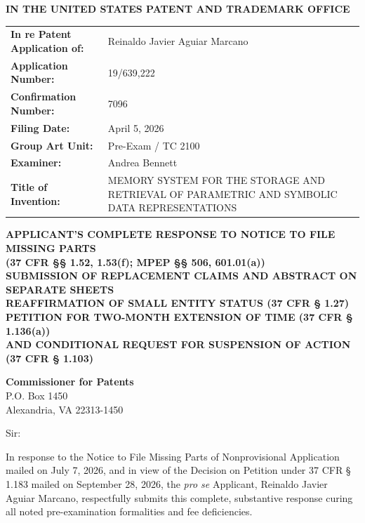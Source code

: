 \documentclass[11pt,letterpaper]{article}
\begin{document}
\thispagestyle{empty}

\begin{center}
    \large\textbf{IN THE UNITED STATES PATENT AND TRADEMARK OFFICE} \\
\end{center}

\vspace{0.3cm}
\noindent\begin{tabular}{p{2.3in}p{4.0in}}
\textbf{In re Patent Application of:} & Reinaldo Javier Aguiar Marcano \\
\textbf{Application Number:} & 19/639,222 \\
\textbf{Confirmation Number:} & 7096 \\
\textbf{Filing Date:} & April 5, 2026 \\
\textbf{Group Art Unit:} & Pre-Exam / TC 2100 \\
\textbf{Examiner:} & Andrea Bennett \\
\textbf{Title of Invention:} & MEMORY SYSTEM FOR THE STORAGE AND RETRIEVAL OF PARAMETRIC AND SYMBOLIC DATA REPRESENTATIONS \\
\end{tabular}

\vspace{0.8cm}
\begin{center}
    \textbf{\large APPLICANT'S COMPLETE RESPONSE TO NOTICE TO FILE MISSING PARTS \\
    (37 CFR \S\S{} 1.52, 1.53(f); MPEP \S\S{} 506, 601.01(a)) \\
    SUBMISSION OF REPLACEMENT CLAIMS AND ABSTRACT ON SEPARATE SHEETS \\
    REAFFIRMATION OF SMALL ENTITY STATUS (37 CFR \S{} 1.27) \\
    PETITION FOR TWO-MONTH EXTENSION OF TIME (37 CFR \S{} 1.136(a)) \\
    AND CONDITIONAL REQUEST FOR SUSPENSION OF ACTION (37 CFR \S{} 1.103)}
\end{center}

\vspace{0.3cm}
\noindent\textbf{Commissioner for Patents} \\
\noindent P.O. Box 1450 \\
\noindent Alexandria, VA 22313-1450

\vspace{0.3cm}
\noindent Sir:

\noindent In response to the Notice to File Missing Parts of Nonprovisional Application mailed on July 7, 2026, and in view of the Decision on Petition under 37 CFR \S{} 1.183 mailed on September 28, 2026, the \textit{pro se} Applicant, Reinaldo Javier Aguiar Marcano, respectfully submits this complete, substantive response curing all noted pre-examination formalities and fee deficiencies.
\end{document}
